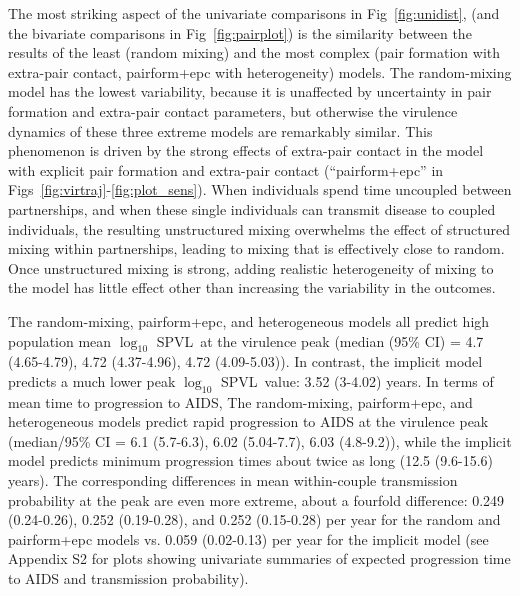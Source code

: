 \documentclass[10pt,letterpaper]{article}
\renewcommand{\figurename}{Fig}
\newcommand{\Lspvl}{$\log_{10}$ SPVL}
\begin{document}
The most striking aspect of the univariate comparisons in
\figurename~\ref{fig:unidist}, (and the bivariate comparisons in
\figurename~\ref{fig:pairplot}) is the similarity between the results of the
least (random mixing) and the most complex (pair formation with
extra-pair contact, pairform+epc with heterogeneity) models. The random-mixing model has the lowest variability, because it is unaffected by uncertainty in pair formation and extra-pair contact parameters, but otherwise the virulence
dynamics of these three extreme models are remarkably similar.
This phenomenon is driven by the strong effects of extra-pair contact in the
model with explicit pair formation and extra-pair contact 
(``pairform+epc'' in \figurename{}s~\ref{fig:virtraj}-\ref{fig:plot_sens}). When individuals spend time uncoupled between
partnerships, and when these single individuals can transmit disease
to coupled individuals, the resulting unstructured mixing overwhelms
the effect of structured mixing within partnerships, leading to mixing
that is effectively close to random.
Once unstructured mixing is strong, adding realistic heterogeneity
of mixing to the model has little effect other than increasing
the variability in the outcomes.

The random-mixing, pairform+epc,
and heterogeneous models all predict high population mean \Lspvl\ at the virulence peak
(median (95\% CI) = 4.7 (4.65-4.79), 
4.72 (4.37-4.96), 4.72  (4.09-5.03)). 
In contrast, the implicit model predicts a much lower peak \Lspvl\ value:
3.52 (3-4.02) years.
In terms of mean time to progression to AIDS,
The random-mixing, pairform+epc, and heterogeneous models predict rapid
progression to AIDS at the virulence peak
(median/95\% CI = 6.1 (5.7-6.3), 6.02 (5.04-7.7), 6.03  (4.8-9.2)),
while the implicit model predicts minimum progression times about twice as long
(12.5 (9.6-15.6) years).
The corresponding differences in  mean within-couple transmission
probability at the peak are even more extreme, about a fourfold difference:
0.249 (0.24-0.26), 0.252 (0.19-0.28), and 0.252 (0.15-0.28) per year for the 
random and pairform+epc models vs. 0.059 (0.02-0.13) per year
for the implicit model (see Appendix S2 for 
plots showing univariate summaries
of expected progression time to AIDS and transmission probability).
\end{document}
